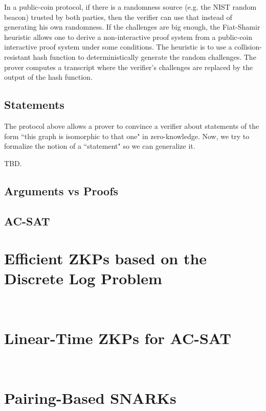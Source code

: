 \documentclass{article}
\begin{document}
In a public-coin protocol, if there is a randomness source (e.g. the NIST random beacon) trusted by both parties, then the verifier can use that instead of generating his own randomness. If the challenges are big enough, the Fiat-Shamir heuristic allows one to derive a non-interactive proof system from a public-coin interactive proof system under some conditions. The heuristic is to use a collision-resistant hash function to deterministically generate the random challenges. The prover computes a transcript where the verifier's challenges are replaced by the output of the hash function.

\subsection*{Statements}

The protocol above allows a prover to convince a verifier about statements of the form ``this graph is isomorphic to that one" in zero-knowledge. Now, we try to formalize the notion of a ``statement" so we can generalize it.

TBD.

\subsection*{Arguments vs Proofs}


\subsection*{AC-SAT}

\section*{Efficient ZKPs based on the Discrete Log Problem}

 \section*{Linear-Time ZKPs for AC-SAT}

 \section*{Pairing-Based SNARKs}
\end{document}
